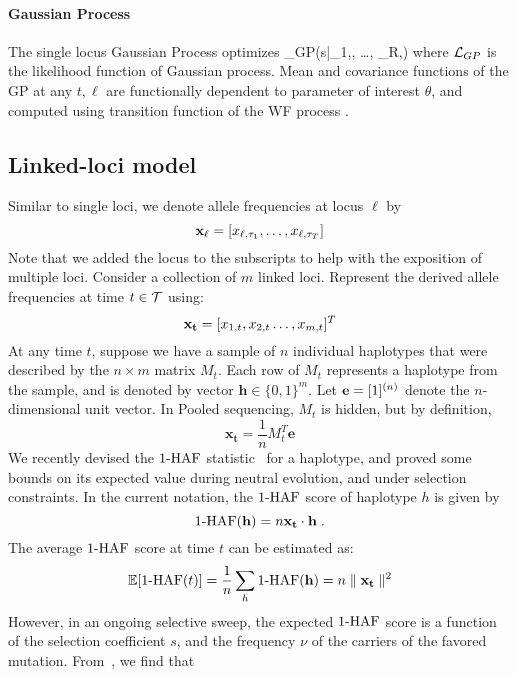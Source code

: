 \paragraph{Gaussian Process}
The single locus Gaussian Process \cite{} optimizes
\beq
\Lc_{GP}(s|\bfx_{1,\ell}, \dots, \bfx_{R,\ell})
\eeq
where ${\cal L}_{GP}$ is the likelihood function  of Gaussian process. Mean and covariance functions of the GP at any $t,\ell$ are functionally dependent to parameter of interest $\theta$, and computed using transition function of the WF process \cite{EandR-GP}.

\subsection*{Linked-loci model}
Similar to single loci, we denote allele frequencies at locus $\ell$ by
\[
{\bf x_{\ell}} = [x_{\ell,\tau_1},\ldots,x_{\ell,\tau_T}]
\]
Note that we added the locus to the subscripts to help with the
exposition of multiple loci. Consider a collection of $m$ linked
loci. Represent the derived allele frequencies at time $t\in {\cal T}$
using:
\[
{\bf x_t} = [x_{1,t},x_{2,t}\ldots,x_{m,t}]^T 
\]
At any time $t$, suppose we have a sample of $n$ individual haplotypes
that were described by the $n\times m$ matrix $M_t$. Each row of $M_t$
represents a haplotype from the sample, and is denoted by vector
$\mathbf{h} \in \{0,1\}^m$. Let ${\bf e} = [1]^{(n)}$ denote the
$n$-dimensional unit vector. In Pooled sequencing, $M_t$ is hidden,
but by definition,
\[
 \mathbf{x_t} = \frac{1}{n} M_t^T\mathbf{e}
\]
We recently devised the $1\text{-HAF}$ statistic~\cite{Ronen2015} for a
haplotype, and proved some bounds on its expected value during neutral
evolution, and under selection constraints. In the current notation,
the $1\text{-HAF}$ score of haplotype $h$ is given by
\begin{equation}
1\text{-HAF}(\mathbf{h})=n\mathbf{x_t} \cdot \mathbf{h}
\;.
\label{eq:1-HAF_SNPmatrix}
\end{equation}
The average $1\text{-HAF}$ score at time $t$ can be estimated as:
\begin{equation} 
\mathbb{E}[1\text{-HAF}(t)]=\frac{1}{n}\sum_h 1\text{-HAF}(\mathbf{h}) = n\parallel \mathbf{x_t}\parallel^2
\end{equation} 
However, in an ongoing selective sweep, the expected $1\text{-HAF}$ score is
a function of the selection coefficient $s$, and the frequency $\nu$
of the carriers of the favored mutation. From~\cite{Ronen2015}, we
find that

